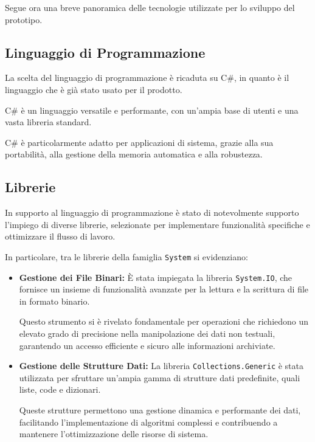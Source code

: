 \documentclass[12pt,a4paper,openright,twoside]{book}
\begin{document}
        Segue ora una breve panoramica delle tecnologie utilizzate per lo sviluppo del prototipo.

        \subsection{Linguaggio di Programmazione}

            La scelta del linguaggio di programmazione è ricaduta su C\#, in quanto è il linguaggio che è già stato usato per il prodotto.

            C\# è un linguaggio versatile e performante, con un'ampia base di utenti e una vasta libreria standard.

            C\# è particolarmente adatto per applicazioni di sistema, grazie alla sua portabilità, alla gestione della memoria automatica e alla robustezza.

        \subsection{Librerie}
        \label{subsec:Librerie}

            In supporto al linguaggio di programmazione è stato di notevolmente supporto l’impiego di diverse librerie, selezionate per implementare funzionalità specifiche e ottimizzare il flusso di lavoro.

            In particolare, tra le librerie della famiglia \texttt{System} si evidenziano:

            \begin{itemize}
                \item \textbf{Gestione dei File Binari:} È stata impiegata la libreria \texttt{System.IO}, che fornisce un insieme di funzionalità avanzate per la lettura e la scrittura di file in formato binario.

                Questo strumento si è rivelato fondamentale per operazioni che richiedono un elevato grado di precisione nella manipolazione dei dati non testuali, garantendo un accesso efficiente e sicuro alle informazioni archiviate.

                \item \textbf{Gestione delle Strutture Dati:} La libreria \texttt{Collections.Generic} è stata utilizzata per sfruttare un’ampia gamma di strutture dati predefinite, quali liste, code e dizionari.

                Queste strutture permettono una gestione dinamica e performante dei dati, facilitando l’implementazione di algoritmi complessi e contribuendo a mantenere l’ottimizzazione delle risorse di sistema.
            \end{itemize}
\end{document}
